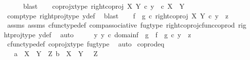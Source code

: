 \begin{isabellebody}
\ \ \ \ \isamarkupfalse%
\ blast\isanewline
\ \ \isamarkupfalse%
\ coproj{\isacharunderscore}{\kern0pt}x{\isacharunderscore}{\kern0pt}type{\isacharcolon}{\kern0pt}\ {\isachardoublequoteopen}right{\isacharunderscore}{\kern0pt}coproj\ X\ Y\ {\isasymcirc}\isactrlsub c\ y\ \ {\isasymin}\isactrlsub c\ X\ {\isasymCoprod}\ Y{\isachardoublequoteclose}\isanewline
\ \ \ \ \isamarkupfalse%
\ comp{\isacharunderscore}{\kern0pt}type\ right{\isacharunderscore}{\kern0pt}proj{\isacharunderscore}{\kern0pt}type\ y{\isacharunderscore}{\kern0pt}def\ \isamarkupfalse%
\ blast\isanewline
\ \ \isamarkupfalse%
\ {\isachardoublequoteopen}{\isacharparenleft}{\kern0pt}f\ {\isasymamalg}\ g{\isacharparenright}{\kern0pt}\ {\isasymcirc}\isactrlsub c\ {\isacharparenleft}{\kern0pt}right{\isacharunderscore}{\kern0pt}coproj\ X\ Y\ {\isasymcirc}\isactrlsub c\ y{\isacharparenright}{\kern0pt}\ {\isacharequal}{\kern0pt}\ z{\isachardoublequoteclose}\isanewline
\ \ \ \ \isamarkupfalse%
\ assms{\isacharparenleft}{\kern0pt}{}{\isacharparenright}{\kern0pt}\ assms{\isacharparenleft}{\kern0pt}{}{\isacharparenright}{\kern0pt}\ cfunc{\isacharunderscore}{\kern0pt}type{\isacharunderscore}{\kern0pt}def\ comp{\isacharunderscore}{\kern0pt}associative\ fug{\isacharunderscore}{\kern0pt}type\ right{\isacharunderscore}{\kern0pt}coproj{\isacharunderscore}{\kern0pt}cfunc{\isacharunderscore}{\kern0pt}coprod\ right{\isacharunderscore}{\kern0pt}proj{\isacharunderscore}{\kern0pt}type\ y{\isacharunderscore}{\kern0pt}def\ \isamarkupfalse%
\ auto\isanewline
\ \ \isamarkupfalse%
\ \isamarkupfalse%
\ {\isachardoublequoteopen}{\isasymexists}y{\isachardot}{\kern0pt}\ y\ {\isasymin}\isactrlsub c\ domain{\isacharparenleft}{\kern0pt}f\ {\isasymamalg}\ g{\isacharparenright}{\kern0pt}\ {\isasymand}\ f\ {\isasymamalg}\ g\ {\isasymcirc}\isactrlsub c\ y\ {\isacharequal}{\kern0pt}\ z{\isachardoublequoteclose}\isanewline
\ \ \ \ \isamarkupfalse%
\ cfunc{\isacharunderscore}{\kern0pt}type{\isacharunderscore}{\kern0pt}def\ coproj{\isacharunderscore}{\kern0pt}x{\isacharunderscore}{\kern0pt}type\ fug{\isacharunderscore}{\kern0pt}type\ \isamarkupfalse%
\ auto\isanewline
{}\isamarkupfalse%
%
\endisatagproof
{\isafoldproof}%
%
\isadelimproof
\isanewline
%
\endisadelimproof
\isanewline
{}\isamarkupfalse%
\ coprod{\isacharunderscore}{\kern0pt}eq{\isacharcolon}{\kern0pt}\isanewline
\ \ \ {\isachardoublequoteopen}a\ {\isacharcolon}{\kern0pt}\ X\ {\isasymCoprod}\ Y\ {\isasymrightarrow}\ Z{\isachardoublequoteclose}\ {\isachardoublequoteopen}b\ {\isacharcolon}{\kern0pt}\ X\ {\isasymCoprod}\ Y\ {\isasymrightarrow}\ \ Z{\isachardoublequoteclose}\isanewline

\end{isabellebody}
